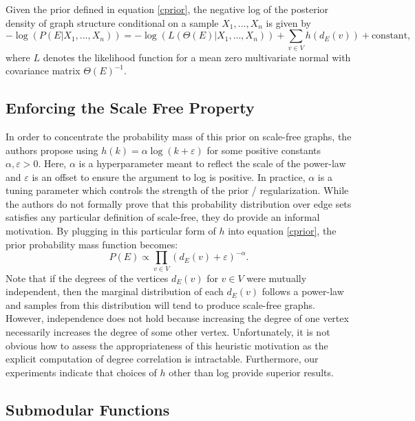 \documentclass{uwstat572}
\theoremstyle{remark}
\theoremstyle{definition}
\begin{document}
Given the prior defined in equation \eqref{cprior}, the negative log of the posterior density of graph structure conditional on a sample $X_1,...,X_n$ is given by
\begin{equation}\label{logpost}
    -\log( P( E | X_1,...,X_n)) = - \log(L(\Theta(E) | X_1,...,X_n) ) + \sum_{v \in V} h( d_E(v)) + \text{constant},
\end{equation}
where $L$ denotes the likelihood function for a mean zero multivariate normal with covariance matrix $\Theta(E)^{-1}$. 

\subsection{Enforcing the Scale Free Property}

In order to concentrate the probability mass of this prior on scale-free graphs, the authors propose using $h(k) = \alpha \log(k + \varepsilon)$ for some positive constants $\alpha, \varepsilon > 0$.  Here, $\alpha$ is a  hyperparameter meant to reflect the scale of the power-law and $\varepsilon$ is an offset to ensure the argument to log is positive. In practice, $\alpha$ is a tuning parameter which controls the strength of the prior / regularization. While the authors do not formally prove that this probability distribution over edge sets satisfies any particular definition of scale-free, they do provide an informal motivation.  By plugging in this particular form of $h$ into equation \eqref{cprior}, the prior probability mass function becomes:
\begin{equation*}
    P( E) \propto \prod_{v \in V} (d_E(v) + \varepsilon)^{-\alpha}.
\end{equation*}
Note that if the degrees of the vertices $d_E(v)$ for $v \in V$ were mutually independent, then the marginal distribution of each $d_E(v)$ follows a power-law and samples from this distribution will tend to produce scale-free graphs.  However, independence does not hold because increasing the degree of one vertex necessarily increases the degree of some other vertex.  Unfortunately, it is not obvious how to assess the appropriateness of this heuristic motivation as the explicit computation of degree correlation is intractable.  Furthermore, our experiments indicate that choices of $h$ other than log provide superior results.

\subsection{Submodular Functions}
\end{document}
